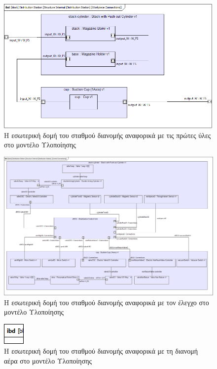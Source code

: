 \documentclass[a4paper,12pt,twoside]{report}
\begin{document}
\begin{appendices}
				\begin{figure}[hp]
					\centering
					\includegraphics[scale=0.50]{DesignModel_StructureInternal(DistributionStation)[WorkpieceConnections].png}
					\caption{Η εσωτερική δομή του σταθμού διανομής αναφορικά με τις πρώτες ύλες στο μοντέλο Υλοποίησης}
					\label{φωτ:Η εσωτερική δομή του σταθμού διανομής αναφορικά με τις πρώτες ύλες στο μοντέλο Υλοποίησης}
				\end{figure}
				
				\begin{figure}[hp]
					\centering
					\includegraphics[scale=0.30]{DesignModel_StructureInternal(DistributionStation)[ControlConnections].png}
					\caption{Η εσωτερική δομή του σταθμού διανομής αναφορικά με τον έλεγχο στο μοντέλο Υλοποίησης}
					\label{φωτ:Η εσωτερική δομή του σταθμού διανομής αναφορικά με τον έλεγχο στο μοντέλο Υλοποίησης}
				\end{figure}
				
				\begin{figure}[hp]
					\centering
					\includegraphics[scale=0.50]{DesignModel_StructureInternal(DistributionStation)[AirConnections].png}
					\caption{Η εσωτερική δομή του σταθμού διανομής αναφορικά με τη διανομή αέρα στο μοντέλο Υλοποίησης}
					\label{φωτ:Η εσωτερική δομή του σταθμού διανομής αναφορικά με τη διανομή αέρα στο μοντέλο Υλοποίησης}
				\end{figure}
				

\end{appendices}
\end{document}
